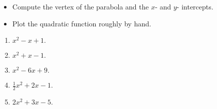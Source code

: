 \begin{itemize}
\item Compute the vertex of the parabola and the $x$- and $y$- intercepts.
\item  Plot the quadratic function roughly by hand.
\end{itemize}

\begin{enumerate}[ref={\fcProblemRef}]
\item $x^2-x+1.$

\item $x^2+x-1.$
\item $x^2-6x+9.$
\item $\frac{1}{2}x^2+2x-1.$
\item $2x^2+3x-5.$
\end{enumerate}